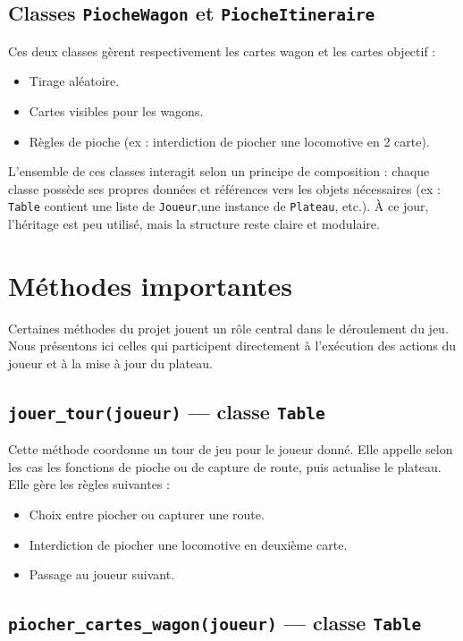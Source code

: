 \documentclass[a4paper,12pt]{report}
\begin{document}
\subsection*{Classes \texttt{PiocheWagon} et \texttt{PiocheItineraire}}

Ces deux classes gèrent respectivement les cartes wagon et les cartes objectif :
\begin{itemize}
    \item Tirage aléatoire.
    \item Cartes visibles pour les wagons.
    \item Règles de pioche (ex : interdiction de piocher une locomotive en 2 carte).
\end{itemize}

\vspace{1em}
L’ensemble de ces classes interagit selon un principe de composition :
chaque classe possède ses propres données et références vers les objets nécessaires
(ex : \texttt{Table} contient une liste de \texttt{Joueur},une instance de \texttt{Plateau}, etc.).
À ce jour, l’héritage est peu utilisé, mais la structure reste claire et modulaire.


\section{Méthodes importantes}

Certaines méthodes du projet jouent un rôle central dans le déroulement du jeu.
Nous présentons ici celles qui participent directement à l'exécution des actions du joueur et à la mise à jour du plateau.

\subsection*{\texttt{jouer\_tour(joueur)} — classe \texttt{Table}}

Cette méthode coordonne un tour de jeu pour le joueur donné.
Elle appelle selon les cas les fonctions de pioche ou de capture de route, puis actualise le plateau.
Elle gère les règles suivantes :
\begin{itemize}
    \item Choix entre piocher ou capturer une route.
    \item Interdiction de piocher une locomotive en deuxième carte.
    \item Passage au joueur suivant.
\end{itemize}

\subsection*{\texttt{piocher\_cartes\_wagon(joueur)} — classe \texttt{Table}}
\end{document}
